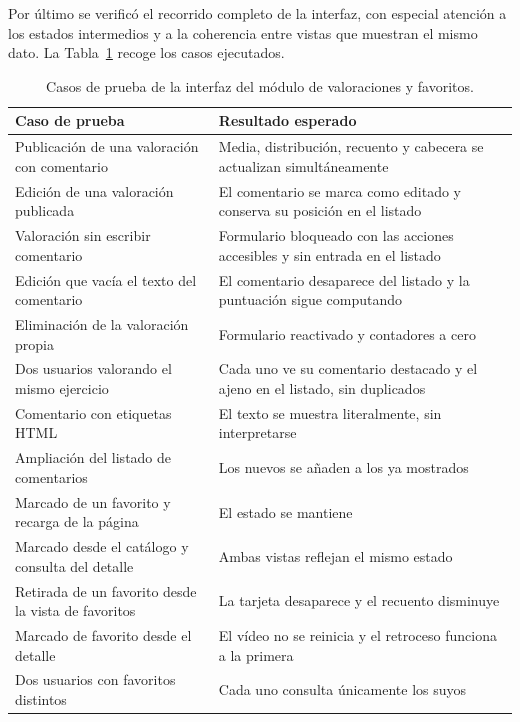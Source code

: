 \documentclass[12pt,a4paper,twoside,openright]{book}
\begin{document}
    Por último se verificó el recorrido completo de la interfaz, con especial
    atención a los estados intermedios y a la coherencia entre vistas que
    muestran el mismo dato. La Tabla~\ref{tab:pruebas-social-ui} recoge los
    casos ejecutados.

    \begin{table}[htbp]
        \centering
        \small
        \begin{tabular}{p{6.5cm} p{6.5cm}}
            \toprule
            \textbf{Caso de prueba} & \textbf{Resultado esperado} \\
            \midrule
            Publicación de una valoración con comentario & Media, distribución, recuento y cabecera se actualizan simultáneamente \\
            Edición de una valoración publicada & El comentario se marca como editado y conserva su posición en el listado \\
            Valoración sin escribir comentario & Formulario bloqueado con las acciones accesibles y sin entrada en el listado \\
            Edición que vacía el texto del comentario & El comentario desaparece del listado y la puntuación sigue computando \\
            Eliminación de la valoración propia & Formulario reactivado y contadores a cero \\
            Dos usuarios valorando el mismo ejercicio & Cada uno ve su comentario destacado y el ajeno en el listado, sin duplicados \\
            Comentario con etiquetas HTML & El texto se muestra literalmente, sin interpretarse \\
            Ampliación del listado de comentarios & Los nuevos se añaden a los ya mostrados \\
            Marcado de un favorito y recarga de la página & El estado se mantiene \\
            Marcado desde el catálogo y consulta del detalle & Ambas vistas reflejan el mismo estado \\
            Retirada de un favorito desde la vista de favoritos & La tarjeta desaparece y el recuento disminuye \\
            Marcado de favorito desde el detalle & El vídeo no se reinicia y el retroceso funciona a la primera \\
            Dos usuarios con favoritos distintos & Cada uno consulta únicamente los suyos \\
            \bottomrule
        \end{tabular}
        \caption{Casos de prueba de la interfaz del módulo de valoraciones y
        favoritos.}
        \label{tab:pruebas-social-ui}
    \end{table}
\end{document}
